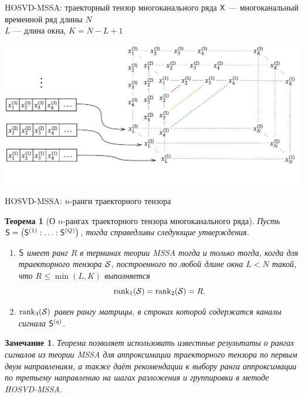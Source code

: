 \documentclass[pdf, unicode, 9pt, notheorems, handout]{beamer}
\newtheorem{theorem}{Теорема}
\newtheorem{remark}{Замечание}
\begin{document}
\begin{frame}{HOSVD-MSSA: траекторный тензор многоканального ряда}
  $\mathsf{X}$ --- многоканальный временной ряд длины $N$\\
  $L$ --- длина окна, $K=N-L+1$

  \vspace{0.4cm}

  \centering
  \includegraphics[width=\textwidth]{../img/mssa_injection_new}
\end{frame}

\begin{frame}{HOSVD-MSSA: $n$-ранги траекторного тензора}
  \begin{theorem}[О $n$-рангах траекторного тензора многоканального ряда]
    Пусть $\mathsf{S} = \left(\mathsf{S}^{(1)} : \ldots : \mathsf{S}^{(Q)}\right)$, тогда
    справедливы следующие утверждения.
    \begin{enumerate}
      \item $\mathsf{S}$ имеет ранг $R$ в терминах теории \textup{MSSA}
        тогда и только тогда, когда для траекторного тензора $\mathcal{S}$,
        построенного по любой длине окна $L<N$ такой, что
        $R \leqslant\min(L, K)$ выполняется
        \[\operatorname{rank}_1(\mathcal{S}) = \operatorname{rank}_2(\mathcal{S}) = R.\]
      \item $\operatorname{rank}_3(\mathcal{S})$ равен рангу матрицы,
        в строках которой содержатся каналы сигнала $\mathsf{S}^{(q)}$.
    \end{enumerate}
  \end{theorem}
  \vspace{0.2cm}
  \begin{remark}
    Теорема позволяет использовать известные результаты о рангах
    сигналов из теории \textup{MSSA}
    для аппроксимации траекторного тензора по первым двум
    направлениям, а также даёт рекомендации к
    выбору ранга аппроксимации по третьему направлению на шагах
    разложения и группировки в методе \textup{HOSVD-MSSA}.
  \end{remark}
\end{frame}
\end{document}
